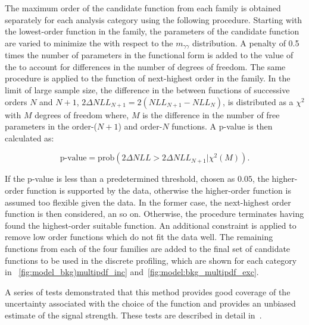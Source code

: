 The maximum order of the candidate function from each family is obtained separately for each analysis category using the following procedure. Starting with the lowest-order function in the family, the parameters of the candidate function are varied to minimize the \NLL with respect to the $m_{\gamma\gamma}$ distribution. A penalty of 0.5 times the number of parameters in the functional form is added to the value of the \NLL to account for differences in the number of degrees of freedom. The same procedure is applied to the function of next-highest order in the family. 
In the limit of large sample size, the difference in the \NLL between functions of successive orders $N$ and $N+1$, $2 \Delta NLL_{N+1} = 2(NLL_{N+1} - NLL_{N})$, is distributed as a $\chi^2$ with $M$ degrees of freedom where, $M$ is the difference in the number of free parameters in the order-($N+1$)  and order-$N$ functions. A p-value is then calculated as:

$$ \text{p-value} = \text{prob}(2 \Delta NLL > 2 \Delta NLL_{N+1}| \chi^2(M)). $$

If the p-value is less than a predetermined threshold, chosen as $0.05$, the higher-order function is supported by the data, otherwise the higher-order function is assumed too flexible given the data. In the former case, the next-highest order function is then considered, an so on. Otherwise, the procedure terminates having found the highest-order suitable function.  An additional constraint is applied to remove low order functions which do not fit the data well. The remaining functions from each of the four families are added to the final set of candidate functions to be used in the discrete profiling, which are shown for each category in \Fig\s~\ref{fig:model_bkg)multipdf_inc} and~\ref{fig:model:bkg_multipdf_exc}.

A series of tests demonstrated that this method provides good coverage of the uncertainty associated with the choice of the function and provides an unbiased estimate of the signal strength. These tests are described in detail in~\cite{DiscreteProfiling}. 

